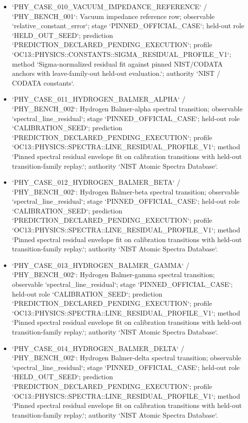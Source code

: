 \begin{itemize}
\item `PHY\_CASE\_010\_VACUUM\_IMPEDANCE\_REFERENCE` / `PHY\_BENCH\_001`: Vacuum impedance reference row; observable `relative\_constant\_error`; stage `PINNED\_OFFICIAL\_CASE`; held-out role `HELD\_OUT\_SEED`; prediction `PREDICTION\_DECLARED\_PENDING\_EXECUTION`; profile `OC13::PHYSICS::CONSTANTS::SIGMA\_RESIDUAL\_PROFILE\_V1`; method `Sigma-normalized residual fit against pinned NIST/CODATA anchors with leave-family-out held-out evaluation.`; authority `NIST / CODATA constants`.
\item `PHY\_CASE\_011\_HYDROGEN\_BALMER\_ALPHA` / `PHY\_BENCH\_002`: Hydrogen Balmer-alpha spectral transition; observable `spectral\_line\_residual`; stage `PINNED\_OFFICIAL\_CASE`; held-out role `CALIBRATION\_SEED`; prediction `PREDICTION\_DECLARED\_PENDING\_EXECUTION`; profile `OC13::PHYSICS::SPECTRA::LINE\_RESIDUAL\_PROFILE\_V1`; method `Pinned spectral residual envelope fit on calibration transitions with held-out transition-family replay.`; authority `NIST Atomic Spectra Database`.
\item `PHY\_CASE\_012\_HYDROGEN\_BALMER\_BETA` / `PHY\_BENCH\_002`: Hydrogen Balmer-beta spectral transition; observable `spectral\_line\_residual`; stage `PINNED\_OFFICIAL\_CASE`; held-out role `CALIBRATION\_SEED`; prediction `PREDICTION\_DECLARED\_PENDING\_EXECUTION`; profile `OC13::PHYSICS::SPECTRA::LINE\_RESIDUAL\_PROFILE\_V1`; method `Pinned spectral residual envelope fit on calibration transitions with held-out transition-family replay.`; authority `NIST Atomic Spectra Database`.
\item `PHY\_CASE\_013\_HYDROGEN\_BALMER\_GAMMA` / `PHY\_BENCH\_002`: Hydrogen Balmer-gamma spectral transition; observable `spectral\_line\_residual`; stage `PINNED\_OFFICIAL\_CASE`; held-out role `CALIBRATION\_SEED`; prediction `PREDICTION\_DECLARED\_PENDING\_EXECUTION`; profile `OC13::PHYSICS::SPECTRA::LINE\_RESIDUAL\_PROFILE\_V1`; method `Pinned spectral residual envelope fit on calibration transitions with held-out transition-family replay.`; authority `NIST Atomic Spectra Database`.
\item `PHY\_CASE\_014\_HYDROGEN\_BALMER\_DELTA` / `PHY\_BENCH\_002`: Hydrogen Balmer-delta spectral transition; observable `spectral\_line\_residual`; stage `PINNED\_OFFICIAL\_CASE`; held-out role `HELD\_OUT\_SEED`; prediction `PREDICTION\_DECLARED\_PENDING\_EXECUTION`; profile `OC13::PHYSICS::SPECTRA::LINE\_RESIDUAL\_PROFILE\_V1`; method `Pinned spectral residual envelope fit on calibration transitions with held-out transition-family replay.`; authority `NIST Atomic Spectra Database`.

\end{itemize}
